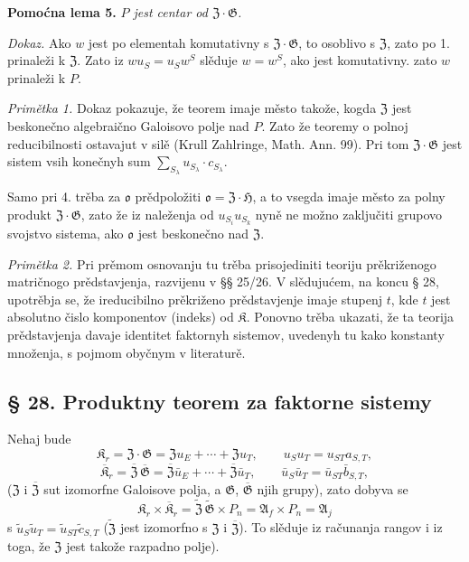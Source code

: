 \documentclass[11pt]{article}
\begin{document}
\noindent\textbf{Pomoćna lema 5.} \emph{\(P\) jest centar od \(\mathfrak Z\cdot\mathfrak G\).}

\noindent\emph{Dokaz.} Ako \(w\) jest po elementah komutativny s \(\mathfrak Z\cdot\mathfrak G\), to osoblivo s \(\mathfrak Z\), zato po 1. prinaleži k \(\mathfrak Z\). Zato iz \(wu_S=u_Sw^S\) slěduje \(w=w^S\), ako jest komutativny. zato \(w\) prinaleži k \(P\).

\noindent\emph{Primětka 1.} Dokaz pokazuje, že teorem imaje město takože, kogda \(\mathfrak Z\) jest beskonečno algebraično Galoisovo polje nad \(P\). Zato že teoremy o polnoj reducibilnosti ostavajut v silě (Krull Zahlringe, Math. Ann. 99). Pri tom \(\mathfrak Z\cdot\mathfrak G\) jest sistem vsih konečnyh sum \(\sum_{S_\lambda}u_{S_\lambda}\cdot c_{S_\lambda}\).

Samo pri 4. trěba za \(\mathfrak o\) prědpoložiti \(\mathfrak o=\mathfrak Z\cdot\mathfrak H\), a to vsegda imaje město za polny produkt \(\mathfrak Z\cdot\mathfrak G\), zato že iz naleženja od \(u_{S_i}u_{S_k}\) nyně ne možno zaključiti grupovo svojstvo sistema, ako \(\mathfrak o\) jest beskonečno nad \(\mathfrak Z\).

\noindent\emph{Primětka 2.} Pri prěmom osnovanju tu trěba prisojediniti teoriju prěkriženogo matričnogo prědstavjenja, razvijenu v §§ 25/26. V slědujućem, na koncu § 28, upotrěbja se, že ireducibilno prěkriženo prědstavjenje imaje stupenj \(t\), kde \(t\) jest absolutno čislo komponentov (indeks) od \(\mathfrak K\). Ponovno trěba ukazati, že ta teorija prědstavjenja davaje identitet faktornyh sistemov, uvedenyh tu kako konstanty množenja, s pojmom obyčnym v literaturě.

\subsection*{§ 28. Produktny teorem za faktorne sistemy}\label{produktsatz-fuer-faktorensysteme}

Nehaj bude
\[
\mathfrak K_r=\mathfrak Z\cdot\mathfrak G
=\mathfrak Zu_E+\cdots+\mathfrak Zu_T,
\qquad u_Su_T=u_{ST}a_{S,T},
\]
\[
\overline{\mathfrak K}_r
=\overline{\mathfrak Z}\,\overline{\mathfrak G}
=\overline{\mathfrak Z}\bar u_E+\cdots+\overline{\mathfrak Z}\bar u_T,
\qquad
\bar u_S\bar u_T=\bar u_{ST}\bar b_{S,T},
\]
(\(\mathfrak Z\) i \(\overline{\mathfrak Z}\) sut izomorfne Galoisove polja, a \(\mathfrak G\), \(\overline{\mathfrak G}\) njih grupy), zato dobyva se
\[
\mathfrak K_r\times\overline{\mathfrak K}_r
=\widetilde{\mathfrak Z}\,\widetilde{\mathfrak G}\times P_n
=\mathfrak A_f\times P_n
=\mathfrak A_j
\]
s \(\tilde u_S\tilde u_T=\tilde u_{ST}\tilde c_{S,T}\) (\(\widetilde{\mathfrak Z}\) jest izomorfno s \(\mathfrak Z\) i \(\overline{\mathfrak Z}\)). To slěduje iz računanja rangov i iz toga, že \(\mathfrak Z\) jest takože razpadno polje).
\end{document}

